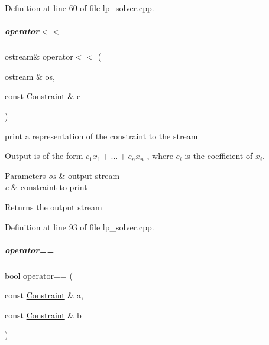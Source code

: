 Definition at line 60 of file lp\+\_\+solver.\+cpp.

\mbox{\label{group___c_l_s_solvers_a7233f9b589a413e310991431039b05b6}} 
\subparagraph{\texorpdfstring{operator$<$$<$}{operator<<}}
{\footnotesize\ttfamily ostream\& operator$<$$<$ (\begin{DoxyParamCaption}\item[{ostream \&}]{os,  }\item[{const \hyperlink{group___c_l_s_solvers_class_l_p___solvers_1_1_constraint}{Constraint} \&}]{c }\end{DoxyParamCaption})\hspace{0.3cm}{\ttfamily [friend]}}



print a representation of the constraint to the stream 

Output is of the form $ c_1 x_1 + \ldots + c_n x_n $ , where $ c_i $ is the coefficient of $ x_i $.


\begin{DoxyParams}{Parameters}
{\em os} & output stream \\
\hline
{\em c} & constraint to print \\
\hline
\end{DoxyParams}
\begin{DoxyReturn}{Returns}
the output stream 
\end{DoxyReturn}


Definition at line 93 of file lp\+\_\+solver.\+cpp.

\mbox{\label{group___c_l_s_solvers_a9411a8f6505608b523a4d5f28014d4c2}} 
\subparagraph{\texorpdfstring{operator==}{operator==}}
{\footnotesize\ttfamily bool operator== (\begin{DoxyParamCaption}\item[{const \hyperlink{group___c_l_s_solvers_class_l_p___solvers_1_1_constraint}{Constraint} \&}]{a,  }\item[{const \hyperlink{group___c_l_s_solvers_class_l_p___solvers_1_1_constraint}{Constraint} \&}]{b }\end{DoxyParamCaption})\hspace{0.3cm}{\ttfamily [friend]}}



